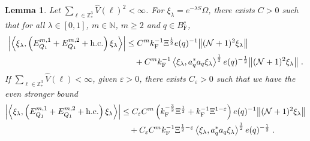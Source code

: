 \documentclass[12pt,a4paper]{article}
\numberwithin{equation}{section}
\newcommand{\NNN}{\mathbb{N}}
\newcommand{\1}{\mathbb{I}}
\newcommand{\F}{\mathrm{F}}
\newcommand{\Z}{\mathbb{Z}}
\newcommand{\NN}{\mathcal{N}}
\newcommand{\half}{\frac{1}{2}}
\newcommand{\eva}[1]{\left\langle #1 \right\rangle}
\theoremstyle{plain}
\newtheorem{lemma}[theorem]{Lemma}
\theoremstyle{definition}
\theoremstyle{remark}
\theoremstyle{plain}
\theoremstyle{definition}
\theoremstyle{remark}
\begin{document}
\begin{lemma} \label{lem:EQ111}
Let $ \sum_{\ell \in \Z^3_*} \hat{V}(\ell)^2 < \infty $. For $\xi_\lambda = e^{-\lambda S} \Omega$, there exists $ C > 0 $ such that for all $ \lambda \in [0,1] $, $ m \in \NNN $, $ m \ge 2 $ and $ q \in B_{\F}^c $,
\begin{align} \label{eq:estEQ111_Coulomb}
	\abs{\eva{\xi_\lambda,\left(E^{m,1}_{Q_1}+E^{m,2}_{Q_1}+\mathrm{h.c.}\right) \xi_\lambda }} 
	&\leq C^m k_{\F}^{-1} \Xi^{\half} e(q)^{-1}
		\norm{ (\NN+1)^2 \xi_\lambda}  \nonumber\\
	&\quad + C^m k_{\F}^{-1} \eva{\xi_\lambda, a_q^* a_q \xi_\lambda}^{\half} e(q)^{-\half} \norm{(\NN+1)^2 \xi_\lambda} \;.
\end{align}
If $ \sum_{\ell \in \Z^3_*} \hat{V}(\ell) < \infty $, given $ \varepsilon > 0 $, there exists $ C_\varepsilon > 0 $ such that we have the even stronger bound
\begin{align} \label{eq:estEQ111}
	\abs{\eva{\xi_\lambda,\left(E^{m,1}_{Q_1}+E^{m,2}_{Q_1}+\mathrm{h.c.}\right) \xi_\lambda }} 
	&\leq C_\varepsilon C^m \left(
		k_{\F}^{-\frac{3}{2}} \Xi^\half
		+ k_{\F}^{-1}\Xi^{1-\varepsilon} \right) e(q)^{-1}
		\norm{ (\NN+1)^2 \xi_\lambda} \nonumber\\
	&\quad + C_\varepsilon C^m k_{\F}^{-1} \Xi^{\half - \varepsilon} \eva{\xi_\lambda, a_q^* a_q \xi_\lambda}^{\half} e(q)^{-\half} \;.
\end{align}
\end{lemma}
\end{document}
